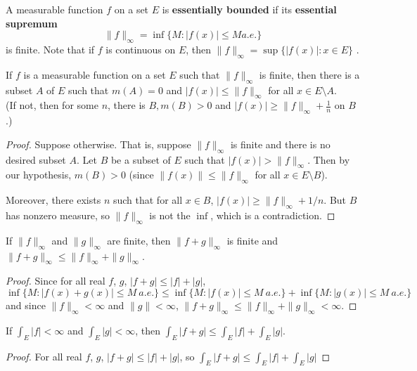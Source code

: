 \begin{defn}%
	A measurable function $f$ on a set $E$ is \textbf{essentially bounded} if its 
	\textbf{essential supremum} 
	\begin{equation*}
		\|f\|_\infty = \inf\{M: |f(x)| \le M a.e.\}
	\end{equation*}
	is finite. Note that if $f$ is continuous on $E$, then $\|f\|_\infty=\sup\{|f(x)|:x\in E\}$ . 
\end{defn}

\begin{pblm}%
	If $f$ is a measurable function on a set $E$ such that $\|f\|_\infty$ is finite, then 
	there is a subset $A$ of $E$ such that $m(A) = 0$ and $|f(x)| \le \|f\|_\infty$ for all 
	$x \in E\setminus A$. \\
	{\scriptsize{(If not, then for some $n$, there is $B, m(B) > 0$ and $|f(x)|\ge\|f\|_\infty + \frac{1}{n}$ 
	on $B$.)}}
\begin{proof}
	Suppose otherwise. That is, suppose $\|f\|_{\infty}$ is finite and there is no desired subset $A$. Let $B$ be a subset of $E$ such that $|f(x)|>\|f\|_{\infty}$. Then by our hypothesis, $m(B)>0$ (since $\|f(x)\| \leq \|f\|_{\infty}$ for all $x \in E\setminus B$). 
	
	Moreover, there exists $n$ such that for all $x \in B$, $|f(x)| \geq \|f\|_{\infty} + 1/n$. But $B$ has nonzero measure, so $\|f\|_{\infty}$ is not the $\inf$, which is a contradiction.
\end{proof}
\end{pblm}

\begin{pblm}%
	If $\|f\|_\infty$ and $\|g\|_\infty$ are finite, then $\|f+g\|_\infty$ is finite and 
	$\|f+g\|_\infty \le \|f\|_\infty+\|g\|_\infty$. 
\begin{proof}
	Since for all real $f$, $g$, $|f + g| \le |f|+|g|$, 
	\begin{equation*}
		\inf\{M: |f(x) + g(x)| \le M ~ a.e.\} \le \inf\{M:|f(x)| \le M ~ a.e.\} + \inf\{M: |g(x)| \le M ~ a.e.\} 
	\end{equation*}
	and since $\|f\|_\infty < \infty$ and $\|g\| < \infty$, $\|f + g\|_\infty \le \|f\|_\infty + \|g\|_\infty < \infty$. 
\end{proof}
\end{pblm}

\begin{pblm}%
	If $\int_E|f|<\infty$ and $\int_E|g|<\infty$, then $\int_E|f+g|\le\int_E|f|+\int_E|g|$. 
\begin{proof}
	For all real $f$, $g$,  $|f + g| \le |f| + |g|$, so $\int_E|f + g|\le \int_E|f| + \int_E|g|$
\end{proof}
\end{pblm}

